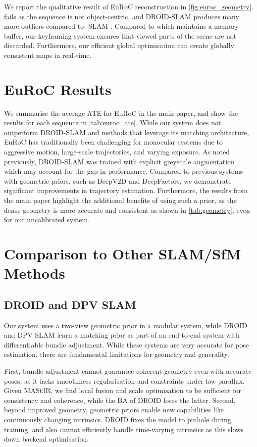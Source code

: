 We report the qualitative result of EuRoC reconstruction in \cref{fig:euroc_geometry}. \spanner fails as the sequence is not object-centric, and DROID-SLAM produces many more outliers compared to \master-SLAM .  Compared to \spanner which maintains a memory buffer, our keyframing system ensures that viewed parts of the scene are not discarded.  Furthermore, our efficient global optimisation can create globally consistent maps in real-time.

\section{EuRoC Results}

We summarise the average ATE for EuRoC in the main paper, and show the results for each sequence in \cref{tab:euroc_ate}.  While our system does not outperform DROID-SLAM and methods that leverage its matching architecture, EuRoC has traditionally been challenging for monocular systems due to aggressive motion, large-scale trajectories, and varying exposure.  As noted previously, DROID-SLAM was trained with explicit greyscale augmentation which may account for the gap in performance.  Compared to previous systems with geometric priors, such as DeepV2D and DeepFactors, we demonstrate significant improvements in trajectory estimation.  Furthermore, the results from the main paper highlight the additional benefits of using such a prior, as the dense geometry is more accurate and consistent as shown in \cref{tab:geometry}, even for our uncalibrated system.

\section{Comparison to Other SLAM/SfM Methods}

\subsection{DROID and DPV SLAM}

Our system uses a two-view geometric prior in a modular system, while DROID and DPV SLAM learn a matching prior as part of an end-to-end system with differentiable bundle adjustment.  While these systems are very accurate for pose estimation, there are fundamental limitations for geometry and generality.

First, bundle adjustment cannot guarantee coherent geometry even with accurate poses, as it lacks smoothness regularisation and constraints under low parallax.  Given MASt3R, we find local fusion and scale optimisation to be sufficient for consistency and coherence, while the BA of DROID loses the latter.
Second, beyond improved geometry, geometric priors enable new capabilities like continuously changing intrinsics.  DROID fixes the model to pinhole during training, and also cannot efficiently handle time-varying intrinsics as this slows down backend optimisation.


